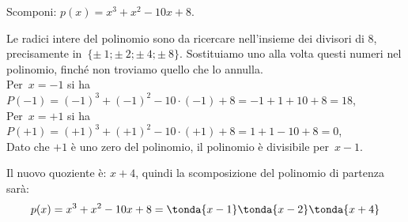 \begin{esempio}{}{}
Scomponi: \(p(x)=x^3+x^2-10x+8\).
\end{esempio}
\begin{soluzione}{}{}
Le radici intere del polinomio sono da ricercare nell'insieme dei 
divisori di \(8\), precisamente in~\(\{\pm~1;\pm~2;\pm~4;\pm~8\}\).
Sostituiamo uno alla volta questi numeri nel polinomio, finché non troviamo 
quello che lo annulla.\\
Per~\(x=-1\) si ha
\(P(-1)=(-1)^{3}+(-1)^{2}-10\cdot (-1)+8=-1+1+10+8=18\),\\
Per~\(x=+1\) si ha
\(P(+1)=(+1)^{3}+(+1)^{2}-10\cdot (+1)+8=1+1-10+8=0\),\\
Dato che \(+1\) è uno zero del polinomio, il polinomio è divisibile 
per~\(x-1\).


Il nuovo quoziente è: \(x+4\), quindi la scomposizione del polinomio di 
partenza sarà:
\[p(x)=x^3+x^2-10x+8 = \tonda{x-1} \tonda{x-2} \tonda{x+4}\]
\end{soluzione}


